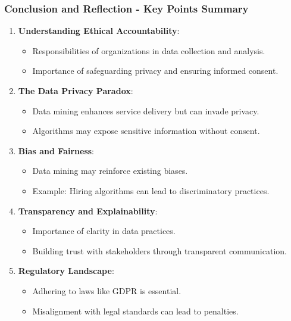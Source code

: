 \documentclass{beamer}
\begin{document}
\begin{frame}[fragile]
    \frametitle{Conclusion and Reflection - Key Points Summary}
    \begin{enumerate}
        \item \textbf{Understanding Ethical Accountability}:
        \begin{itemize}
            \item Responsibilities of organizations in data collection and analysis.
            \item Importance of safeguarding privacy and ensuring informed consent.
        \end{itemize}
        
        \item \textbf{The Data Privacy Paradox}:
        \begin{itemize}
            \item Data mining enhances service delivery but can invade privacy.
            \item Algorithms may expose sensitive information without consent.
        \end{itemize}
        
        \item \textbf{Bias and Fairness}:
        \begin{itemize}
            \item Data mining may reinforce existing biases.
            \item Example: Hiring algorithms can lead to discriminatory practices.
        \end{itemize}
        
        \item \textbf{Transparency and Explainability}:
        \begin{itemize}
            \item Importance of clarity in data practices.
            \item Building trust with stakeholders through transparent communication.
        \end{itemize}
        
        \item \textbf{Regulatory Landscape}:
        \begin{itemize}
            \item Adhering to laws like GDPR is essential.
            \item Misalignment with legal standards can lead to penalties.
        \end{itemize}
    \end{enumerate}
\end{frame}
\end{document}
